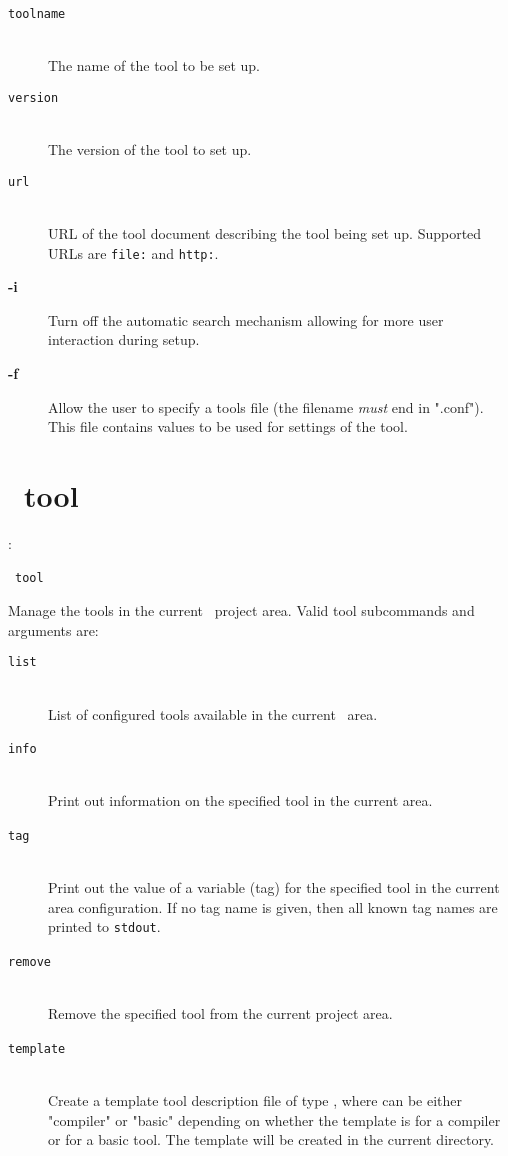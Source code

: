 \begin{description}
\item[\texttt{toolname}]\mbox{}\\
  The name of the tool to be set up.
\item[\texttt{version}]\mbox{}\\
  The version of the tool to set up.
\item[\texttt{url}]\mbox{}\\
  URL of the tool document describing the tool being set up. Supported
  URLs are \texttt{file:} and \texttt{http:}.\\
\item[\textbf{-i}]
  Turn off the automatic search mechanism allowing for more
  user interaction during setup.
\item[\textbf{-f}]
  Allow the user to specify a tools file (the
  filename \textit{must} end in ".conf"). This file contains values 
  to be used for settings of the tool.  
\end{description}


\section{\scram\ tool}

\cmdintro:

       \hspace{5mm}\scram~\texttt{tool}~

\ni Manage the tools in the current \scram\ project area.
Valid tool subcommands and arguments are:

\begin{description}
\item[\texttt{list}]\mbox{}\\ 
  List of configured tools available in the current \scram\ area.
\item[\texttt{info}~]\mbox{}\\
  Print out information on the specified tool in the current area.
\item[\texttt{tag}~~]\mbox{}\\
  Print out the value of a variable (tag) for the specified tool in the
  current area configuration. If no tag name is given, then all known tag
  names are printed to \texttt{stdout}.
\item[\texttt{remove}~]\mbox{}\\
  Remove the specified tool from the current project area.
\item[\texttt{template}~]\mbox{}\\
  Create a template tool description file of type ,
  where  can be either "compiler" or "basic" depending on whether the
  template is for a compiler or for a basic tool. The template will be
  created in the current directory.
\end{description}

